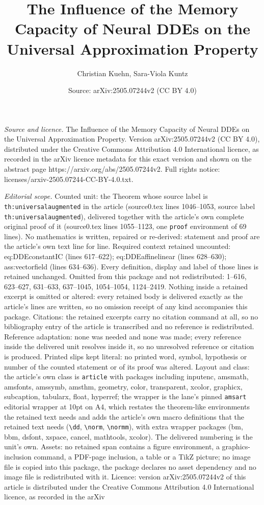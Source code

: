 \documentclass[10pt,a4paper]{amsart}
\title[The Influence of the Memory Capacity of Neural DDEs on the U]{The Influence of the Memory Capacity of Neural DDEs on the Universal Approximation Property}
\author{Christian Kuehn, Sara-Viola Kuntz}
\date{Source: arXiv:2505.07244v2 (CC BY 4.0)}
\begin{document}
\maketitle

\noindent\emph{Source and licence.} The Influence of the Memory Capacity of Neural DDEs on the Universal Approximation Property. Version arXiv:2505.07244v2 (CC BY 4.0), distributed under the Creative Commons Attribution 4.0 International licence, as recorded in the arXiv licence metadata for this exact version and shown on the abstract page https://arxiv.org/abs/2505.07244v2. Full rights notice: licenses/arxiv-2505.07244-CC-BY-4.0.txt.\par\smallskip

\noindent\textit{Editorial scope.} Counted unit: the Theorem whose source label is \texttt{th:universalaugmented} in the article (source0.tex lines 1046--1053, source label \texttt{th:universalaugmented}), delivered together with the article's own complete original proof of it (source0.tex lines 1055--1123, one \texttt{proof} environment of 69 lines). No mathematics is written, repaired or re-derived: statement and proof are the article's own text line for line. Required context retained uncounted: eq:DDEconstantIC (lines 617--622); eq:DDEaffinelinear (lines 628--630); ass:vectorfield (lines 634--636). Every definition, display and label of those lines is retained unchanged. Omitted from this package and not redistributed: 1--616, 623--627, 631--633, 637--1045, 1054--1054, 1124--2419. Nothing inside a retained excerpt is omitted or altered: every retained body is delivered exactly as the article's lines are written, so no omission receipt of any kind accompanies this package. Citations: the retained excerpts carry no citation command at all, so no bibliography entry of the article is transcribed and no reference is redistributed. Reference adaptation: none was needed and none was made; every reference inside the delivered unit resolves inside it, so no unresolved reference or citation is produced. Printed slips kept literal: no printed word, symbol, hypothesis or number of the counted statement or of its proof was altered. Layout and class: the article's own class is \texttt{article} with packages including inputenc, amsmath, amsfonts, amssymb, amsthm, geometry, color, transparent, xcolor, graphicx, subcaption, tabularx, float, hyperref; the wrapper is the lane's pinned \texttt{amsart} editorial wrapper at 10pt on A4, which restates the theorem-like environments the retained text needs and adds the article's own macro definitions that the retained text needs (\texttt{\textbackslash dd}, \texttt{\textbackslash norm}, \texttt{\textbackslash normm}), with extra wrapper packages (bm, bbm, dsfont, xspace, cancel, mathtools, xcolor). The delivered numbering is the unit's own. Assets: no retained span contains a figure environment, a graphics-inclusion command, a PDF-page inclusion, a table or a TikZ picture; no image file is copied into this package, the package declares no asset dependency and no image file is redistributed with it. Licence: version arXiv:2505.07244v2 of this article is distributed under the Creative Commons Attribution 4.0 International licence, as recorded in the arXiv 
\end{document}
